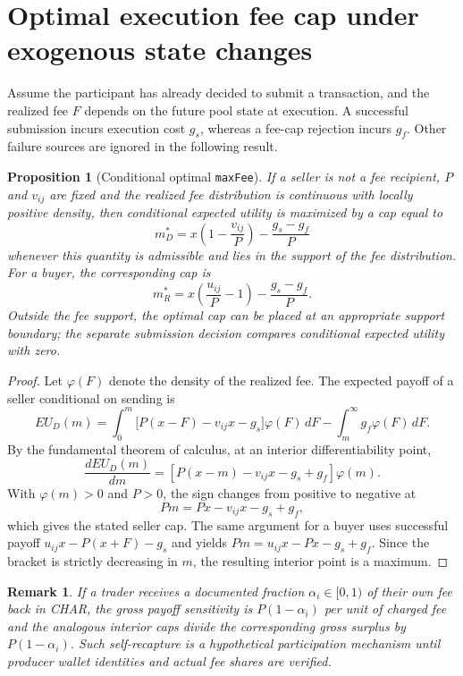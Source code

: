 \documentclass[11pt]{article}
\newtheorem{proposition}{Proposition}
\newtheorem{remark}{Remark}
\begin{document}
\section{Optimal execution fee cap under exogenous state changes}
Assume the participant has already decided to submit a transaction, and the realized fee $F$ depends on the future pool state at execution. A successful submission incurs execution cost $g_s$, whereas a fee-cap rejection incurs $g_f$. Other failure sources are ignored in the following result.
\begin{proposition}[Conditional optimal \texttt{maxFee}]
If a seller is not a fee recipient, $P$ and $v_{ij}$ are fixed and the realized fee distribution is continuous with locally positive density, then conditional expected utility is maximized by a cap equal to
\begin{equation}
m^*_D=x\left(1-\frac{v_{ij}}P\right)-\frac{g_s-g_f}{P}
\end{equation}
whenever this quantity is admissible and lies in the support of the fee distribution. For a buyer, the corresponding cap is
\begin{equation}
m^*_R=x\left(\frac{u_{ij}}P-1\right)-\frac{g_s-g_f}{P}.
\end{equation}
Outside the fee support, the optimal cap can be placed at an appropriate support boundary; the separate submission decision compares conditional expected utility with zero.
\end{proposition}
\begin{proof}
Let $\varphi(F)$ denote the density of the realized fee. The expected payoff of a seller conditional on sending is
\[
EU_D(m)=\int_0^m\big[P(x-F)-v_{ij}x-g_s\big]\varphi(F)\,dF
-\int_m^{\infty}g_f\varphi(F)\,dF.
\]
By the fundamental theorem of calculus, at an interior differentiability point,
\[
\frac{dEU_D(m)}{dm}=
\left[P(x-m)-v_{ij}x-g_s+g_f\right]\varphi(m).
\]
With $\varphi(m)>0$ and $P>0$, the sign changes from positive to negative at
\[
Pm=Px-v_{ij}x-g_s+g_f,
\]
which gives the stated seller cap. The same argument for a buyer uses successful payoff $u_{ij}x-P(x+F)-g_s$ and yields $Pm=u_{ij}x-Px-g_s+g_f$. Since the bracket is strictly decreasing in $m$, the resulting interior point is a maximum. 
\end{proof}

\begin{remark}
If a trader receives a documented fraction $\alpha_i\in[0,1)$ of their own fee back in CHAR, the gross payoff sensitivity is $P(1-\alpha_i)$ per unit of charged fee and the analogous interior caps divide the corresponding gross surplus by $P(1-\alpha_i)$. Such self-recapture is a hypothetical participation mechanism until producer wallet identities and actual fee shares are verified.
\end{remark}
\end{document}
